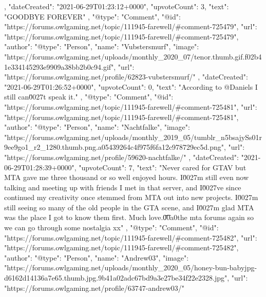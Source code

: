 {{{            },
            "dateCreated": "2021-06-29T01:23:12+0000",
            "upvoteCount": 3,
            "text": "GOODBYE FOREVER\n \n"
        },
        {
            "@type": "Comment",
            "@id": "https://forums.owlgaming.net/topic/111945-farewell/#comment-725479",
            "url": "https://forums.owlgaming.net/topic/111945-farewell/#comment-725479",
            "author": {
                "@type": "Person",
                "name": "Vubstersmurf",
                "image": "https://forums.owlgaming.net/uploads/monthly_2020_07/tenor.thumb.gif.f02b41e334145293e9909a38bb2b0c94.gif",
                "url": "https://forums.owlgaming.net/profile/62823-vubstersmurf/"
            },
            "dateCreated": "2021-06-29T01:26:52+0000",
            "upvoteCount": 0,
            "text": "According to @Daniels I still can\u0027t speak it.\n \n"
        },
        {
            "@type": "Comment",
            "@id": "https://forums.owlgaming.net/topic/111945-farewell/#comment-725481",
            "url": "https://forums.owlgaming.net/topic/111945-farewell/#comment-725481",
            "author": {
                "@type": "Person",
                "name": "Nachtfalke",
                "image": "https://forums.owlgaming.net/uploads/monthly_2019_05/tumblr_n5bsajySs01r9ee9go1_r2_1280.thumb.png.a05439264c4f975f6fa12c978729ec5d.png",
                "url": "https://forums.owlgaming.net/profile/59620-nachtfalke/"
            },
            "dateCreated": "2021-06-29T01:28:39+0000",
            "upvoteCount": 7,
            "text": "Never cared for GTAV but MTA gave me three thousand or so well enjoyed hours. I\u0027m still even now talking and meeting up with friends I met in that server, and I\u0027ve since continued my creativity once stemmed from MTA out into new projects. I\u0027m still seeing so many of the old people in the GTA scene, and I\u0027m glad MTA was the place I got to know them first. Much love.\n \n\n\n\t\u00a0\n \n\n\n\tunlock the mta forums again so we can go through some nostalgia xx\n \n"
        },
        {
            "@type": "Comment",
            "@id": "https://forums.owlgaming.net/topic/111945-farewell/#comment-725482",
            "url": "https://forums.owlgaming.net/topic/111945-farewell/#comment-725482",
            "author": {
                "@type": "Person",
                "name": "Andrew03",
                "image": "https://forums.owlgaming.net/uploads/monthly_2020_05/honey-bun-babyjpg-d6162d14136a7e65.thumb.jpg.9b41a02adc67bd9a3e27be34f22e2328.jpg",
                "url": "https://forums.owlgaming.net/profile/63747-andrew03/"
}}}
